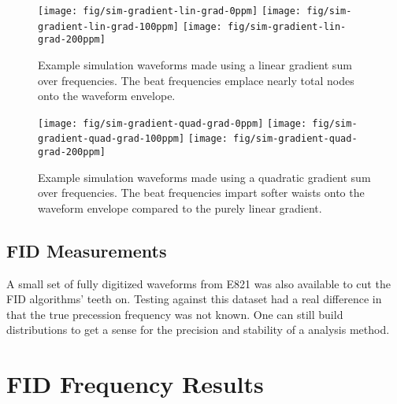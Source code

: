 \begin{figure}
\label{fig:sim-gradient-lin-grad}
\texttt{[image: fig/sim-gradient-lin-grad-0ppm]}
\texttt{[image: fig/sim-gradient-lin-grad-100ppm]}
\texttt{[image: fig/sim-gradient-lin-grad-200ppm]}
\caption{Example simulation waveforms made using a linear gradient sum over frequencies.  The beat frequencies emplace nearly total nodes onto the waveform envelope.}
\end{figure}

\begin{figure}
\label{fig:sim-gradient-quad-grad}
\texttt{[image: fig/sim-gradient-quad-grad-0ppm]}
\texttt{[image: fig/sim-gradient-quad-grad-100ppm]}
\texttt{[image: fig/sim-gradient-quad-grad-200ppm]}
\caption{Example simulation waveforms made using a quadratic gradient sum over frequencies.  The beat frequencies impart softer waists onto the waveform envelope compared to the purely linear gradient.}
\end{figure}


\subsection{FID Measurements}
A small set of fully digitized waveforms from E821 was also available to cut the FID algorithms' teeth on.  Testing against this dataset had a real difference in that the true precession frequency was not known.  One can still build distributions to get a sense for the precision and stability of a analysis method.


\section{FID Frequency Results}

